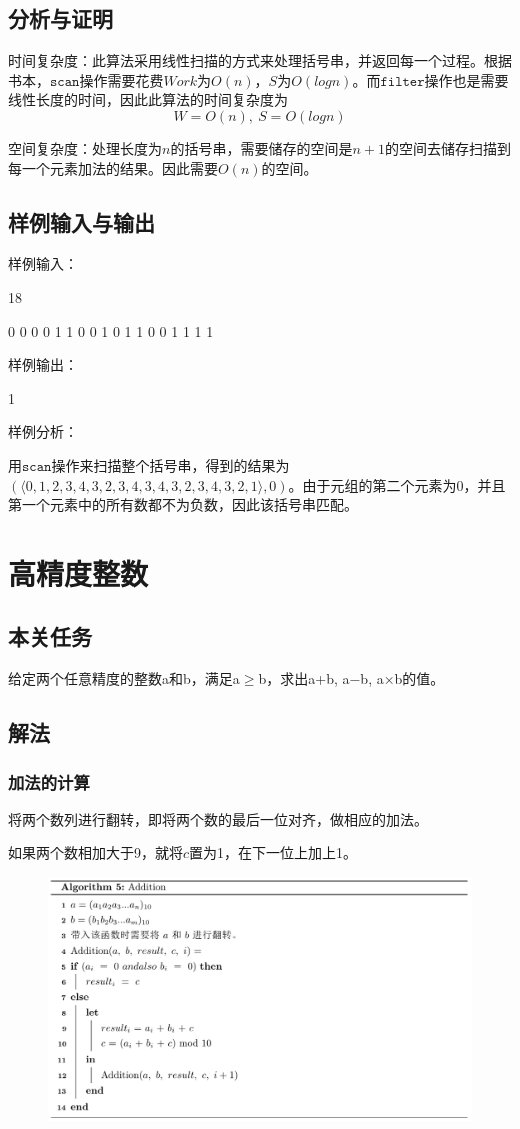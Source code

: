 \documentclass[UTF8,a4paperdui, %
]{ctexart}
\begin{document}
\subsection{分析与证明}
时间复杂度：此算法采用线性扫描的方式来处理括号串，并返回每一个过程。根据书本，$\texttt{scan}$操作需要花费$Work$为$O(n)$，$S$为$O(logn)$。而$\texttt{filter}$操作也是需要线性长度的时间，因此此算法的时间复杂度为
\[
  W=O(n),\ S=O(logn)
\]


空间复杂度：处理长度为$n$的括号串，需要储存的空间是$n+1$的空间去储存扫描到每一个元素加法的结果。因此需要$O(n)$的空间。
\subsection{样例输入与输出}
样例输入：

18

0 0 0 0 1 1 0 0 1 0 1 1 0 0 1 1 1 1

样例输出：

1

样例分析：

用$\texttt{scan}$操作来扫描整个括号串，得到的结果为$(\langle 0,1,2,3,4,3,2,3,4,3,4,3,2,3,4,3,2,1\rangle ,0)$。由于元组的第二个元素为0，并且第一个元素中的所有数都不为负数，因此该括号串匹配。


\section{高精度整数}
\subsection{本关任务}
给定两个任意精度的整数a和b，满足a$\geq$b，求出a+b, a−b, a×b的值。
\subsection{解法}
\subsubsection{加法的计算}
将两个数列进行翻转，即将两个数的最后一位对齐，做相应的加法。

如果两个数相加大于9，就将$c$置为1，在下一位上加上1。
\begin{figure}[ht]
\centering
\includegraphics[scale=0.57]{Addition.png}
\end{figure}
\end{document}
